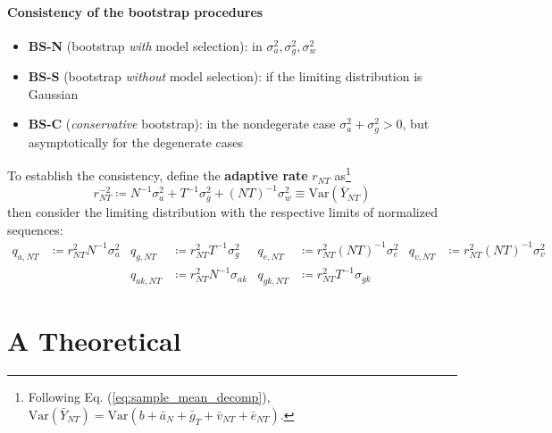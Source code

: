 \documentclass[twoside]{article}
\begin{document}
\paragraph*{Consistency of the bootstrap procedures}
\begin{itemize}
    \item {\textbf{BS-N}} (bootstrap \textit{with} model selection):  in $\sigma^2_a,\sigma^2_g,\sigma^2_w$
    \item {\textbf{BS-S}} (bootstrap \textit{without} model selection):  if the limiting distribution is Gaussian
    \item {\textbf{BS-C}} (\textit{conservative} bootstrap):  in the nondegerate case $\sigma^2_a + \sigma^2_g >0$, but asymptotically  for the degenerate cases
\end{itemize}
To establish the consistency, define the \textbf{adaptive rate} $r_{NT}$ as\footnote{Following Eq. (\ref{eq:sample_mean_decomp}), $\mathrm{Var}(\bar{Y}_{NT}) = \mathrm{Var}(b+\bar{a}_N +\bar{g}_T + \bar{v}_{NT} + \bar{e}_{NT})$.}
\begin{equation*}
    r^{-2}_{NT} \coloneq N^{-1}\sigma^2_a + T^{-1}\sigma^2_g + (NT)^{-1}\sigma^2_w \equiv \mathrm{Var}(\bar{Y}_{NT})
\end{equation*}
then consider the limiting distribution with the respective limits of normalized sequences:
\begin{align}
    q_{a,NT} &\coloneq r^2_{NT}N^{-1}\sigma^2_a & q_{g,NT} &\coloneq r^2_{NT}T^{-1}\sigma^2_g & q_{e,NT} &\coloneq r^2_{NT}(NT)^{-1}\sigma^2_e & q_{v,NT} &\coloneq r^2_{NT}(NT)^{-1}\sigma^2_v \\
    & & q_{ak,NT} & \coloneq r^2_{NT}N^{-1}\sigma_{ak} & q_{gk,NT} &\coloneq r^2_{NT}T^{-1}\sigma_{gk}\nonumber
\end{align}


\section*{A Theoretical}
\citet{chiang2023using}

\newpage


\end{document}
